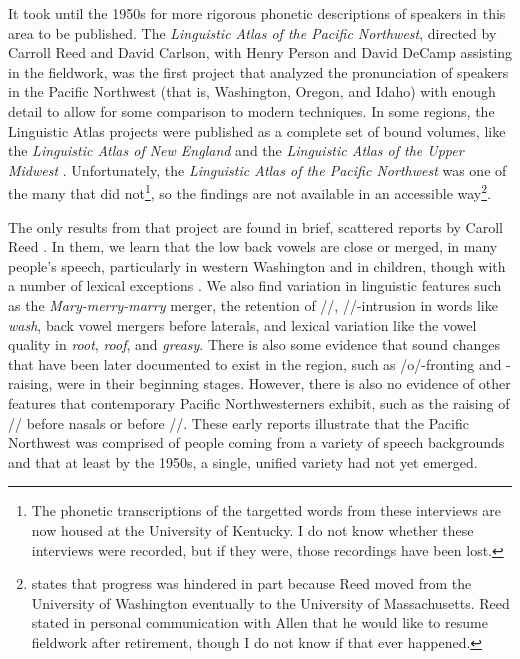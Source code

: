 It took until the 1950s for more rigorous phonetic descriptions of speakers in this area to be published. The \textit{Linguistic Atlas of the Pacific Northwest}, directed by Carroll Reed and David Carlson, with Henry Person and David DeCamp assisting in the fieldwork, was the first project that analyzed the pronunciation of speakers in the Pacific Northwest (that is, Washington, Oregon, and Idaho) with enough detail to allow for some comparison to modern techniques. In some regions, the Linguistic Atlas projects were published as a complete set of bound volumes, like the \textit{Linguistic Atlas of New England} \citep{kurath_1939_lane} and the \textit{Linguistic Atlas of the Upper Midwest} \citep{allen_1973_laum}. Unfortunately, the \textit{Linguistic Atlas of the Pacific Northwest} was one of the many that did not\footnote{The phonetic transcriptions of the targetted words from these interviews are now housed at the University of Kentucky. I do not know whether these interviews were recorded, but if they were, those recordings have been lost.}, so the findings are not available in an accessible way\footnote{\citet[186]{allen_1977} states that progress was hindered in part because Reed moved from the University of Washington eventually to the University of Massachusetts. Reed stated in personal communication with Allen that he would like to resume fieldwork after retirement, though I do not know if that ever happened.}.

The only results from that project are found in brief, scattered reports by Caroll Reed \citeyearpar{reed_1952, reed_1956, reed_1957, reed_1961, reed_1967}. In them, we learn that the low back vowels are close or merged, in many people's speech, particularly in western Washington and in children, though with a number of lexical exceptions \citeyearpar[Reed][]{reed_1952}. We also find variation in linguistic features such as the \textit{Mary-merry-marry} merger, the retention of //, //-intrusion in words like \textit{wash}, back vowel mergers before laterals, and lexical variation like the vowel quality in \textit{root}, \textit{roof}, and \textit{greasy}. There is also some evidence that sound changes that have been later documented to exist in the region, such as /o/-fronting and \beg-raising, were in their beginning stages. However, there is also no evidence of other features that contemporary Pacific Northwesterners exhibit, such as the raising of /\textipa{\ae}/ before nasals or before //. These early reports illustrate that the Pacific Northwest was comprised of people coming from a variety of speech backgrounds and that at least by the 1950s, a single, unified variety had not yet emerged.

